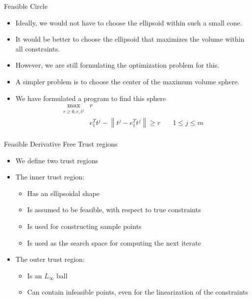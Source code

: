 \documentclass{beamer}
\begin{document}
\begin{frame}{Feasible Circle}

\begin{itemize}
	\item Ideally, we would not have to choose the ellipsoid within such a small cone.
	\item It would be better to choose the ellipsoid that maximizes the volume within all constraints.
	\item However, we are still formulating the optimization problem for this.
	\item A simpler problem is to choose the center of the maximum volume sphere.
	\item We have formulated a program to find this sphere
		\begin{align*}
\max_{r \ge 0, c, t^j}	& r & \\
					&  e_1^T t^j - \left\|t^j - e_1^T t^j\right\| \ge r			& \quad 1 \le j \le m \\
		\end{align*}
\end{itemize}

\end{frame}


\begin{frame}{Feasible Derivative Free Trust regions}
    \begin{itemize}
        \item We define two trust regions
        \item The inner trust region:
            \begin{itemize}
                \item Has an ellipsoidal shape
                \item Is assumed to be feasible, with respect to true constraints
                \item Is used for constructing sample points
                \item Is used as the search space for computing the next iterate
            \end{itemize}
        \item The outer trust region:
            \begin{itemize}
                \item Is an $L_{\infty}$ ball
                \item Can contain infeasible points, even for the linearization of the constraints
            \end{itemize}
    \end{itemize}
\end{frame}
\end{document}
